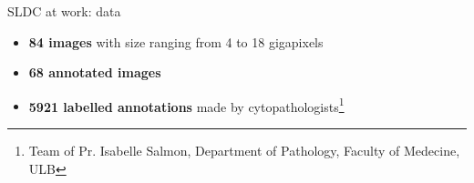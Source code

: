 \documentclass{beamer}
\begin{document}
\begin{frame}{SLDC at work: data}
	\begin{itemize}
		\item \textbf{84 images} with size ranging from 4 to 18 gigapixels
		\item \textbf{68 annotated images} 
		\item \textbf{5921 labelled annotations} made by cytopathologists\footnote[frame]{Team of Pr. Isabelle Salmon, Department of Pathology, Faculty of Medecine, ULB}
	\end{itemize}

	\begin{figure}
		\center
	\end{figure}
\end{frame}
\end{document}
